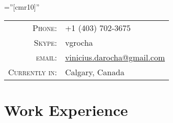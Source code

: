 \documentclass[a4paper,10pt]{article} %
\begin{document}
\pagestyle{empty} %

\font\fb=''[cmr10]'' %


\par{\bigskip\par} %


\begin{tabular}{rl}
  \textsc{Phone:} &
  +1 (403) 702-3675\\

  \textsc{Skype:} &
  vgrocha\\
  
\textsc{email:} &
\href{mailto:vinicius.darocha@gmail.com}{vinicius.darocha@gmail.com} \\

\textsc{Currently in:} &
Calgary, Canada 

\end{tabular}


\section{Work Experience}
\end{document}
